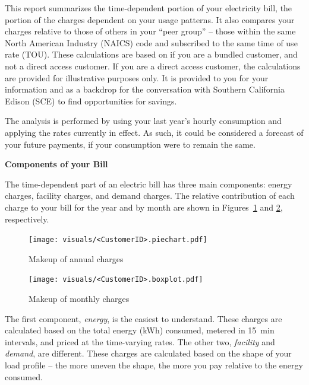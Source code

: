 \documentclass[10pt]{article}
\begin{document}
\pagestyle{title}
This report summarizes the time-dependent portion of your electricity bill, the portion of the charges dependent on your usage patterns.
It also compares your charges relative to those of others in your ``peer group'' -- those within the same North American Industry (NAICS) code and subscribed to the same time of use rate (TOU).
These calculations are based on if you are a bundled customer, and not a direct access customer.
If you are a direct access customer, the calculations are provided for illustrative purposes only.  
It is provided to you for your information and as a backdrop for the conversation with Southern California Edison (SCE) to find opportunities for savings.

The analysis is performed by using your last year's hourly consumption and applying the rates currently in effect.
As such, it could be considered a forecast of your future payments, if your consumption were to remain the same.

\vspace{3ex}
\textbf{\Large Components of your Bill}
\vspace{1ex}

The time-dependent part of an electric bill has three main components: energy charges, facility charges, and demand charges.
The relative contribution of each charge to your bill for the year and by month are shown in Figures~\ref{fig:pie} and \ref{fig:bars}, respectively.
\begin{figure}[!h]
\centering
\texttt{[image: visuals/<CustomerID>.piechart.pdf]}
\caption{Makeup of annual charges}
\label{fig:pie}
\end{figure}

\begin{figure}[!h]
\centering
\texttt{[image: visuals/<CustomerID>.boxplot.pdf]}
\caption{Makeup of monthly charges}
\label{fig:bars}
\end{figure}

The first component, \emph{energy}, is the easiest to understand.
These charges are calculated based on the total energy (kWh) consumed, metered in 15~min intervals, and priced at the time-varying rates.
The other two, \emph{facility} and \emph{demand}, are different.
These charges are calculated based on the shape of your load profile -- the more uneven the shape, the more you pay relative to the energy consumed.

\vfill\eject %
\end{document}
